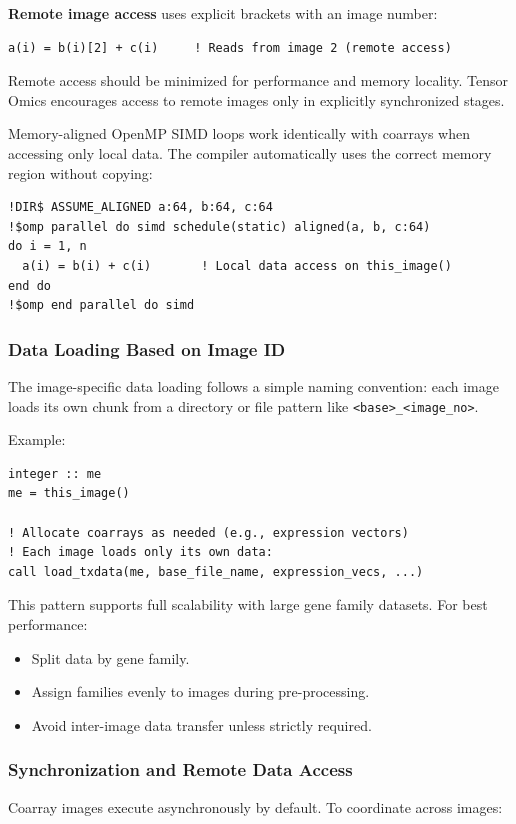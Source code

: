 \documentclass{article}
\begin{document}
\textbf{Remote image access} uses explicit brackets with an image number:
\begin{verbatim}
a(i) = b(i)[2] + c(i)     ! Reads from image 2 (remote access)
\end{verbatim}

Remote access should be minimized for performance and memory locality. Tensor Omics encourages access to remote images only in explicitly synchronized stages.

Memory-aligned OpenMP SIMD loops work identically with coarrays when accessing only local data. The compiler automatically uses the correct memory region without copying:

\begin{verbatim}
!DIR$ ASSUME_ALIGNED a:64, b:64, c:64
!$omp parallel do simd schedule(static) aligned(a, b, c:64)
do i = 1, n
  a(i) = b(i) + c(i)       ! Local data access on this_image()
end do
!$omp end parallel do simd
\end{verbatim}

\subsubsection{Data Loading Based on Image ID}
The image-specific data loading follows a simple naming convention: each image loads its own chunk from a directory or file pattern like \texttt{<base>\_<image\_no>}.

Example:
\begin{verbatim}
integer :: me
me = this_image()

! Allocate coarrays as needed (e.g., expression vectors)
! Each image loads only its own data:
call load_txdata(me, base_file_name, expression_vecs, ...)
\end{verbatim}

This pattern supports full scalability with large gene family datasets. For best performance:
\begin{itemize}
\item Split data by gene family.
\item Assign families evenly to images during pre-processing.
\item Avoid inter-image data transfer unless strictly required.
\end{itemize}

\subsubsection{Synchronization and Remote Data Access}
Coarray images execute asynchronously by default. To coordinate across images:
\end{document}
